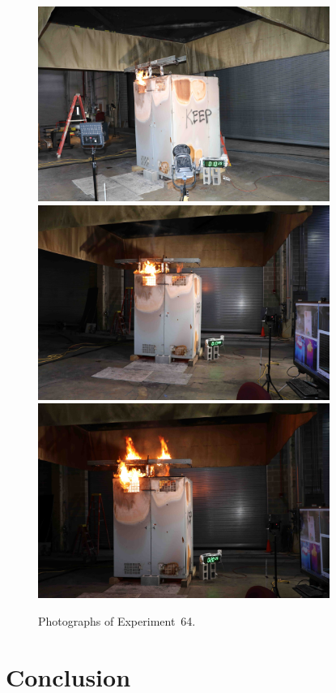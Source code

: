 \begin{figure}[p]
\centering
\includegraphics[height=2.50in]{../FIGURES/Test_64_10_min_39_s} \\
\includegraphics[height=2.50in]{../FIGURES/Test_64_17_min_8_s} \\
\includegraphics[height=2.50in]{../FIGURES/Test_64_20_min_26_s}
\caption[Photographs of Experiment~64]{Photographs of Experiment~64.}
\label{fig:Test_64_photos}
\end{figure}




\clearpage

\section{Conclusion}

